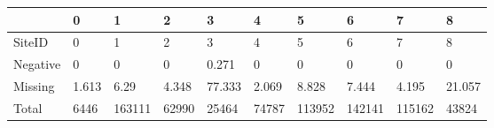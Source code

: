 \begin{tabular}{llllllllll}
\toprule
{} &      0 &       1 &      2 &       3 &      4 &       5 &       6 &       7 &       8 \\
\midrule
SiteID   &      0 &       1 &      2 &       3 &      4 &       5 &       6 &       7 &       8 \\
Negative &      0 &       0 &      0 &   0.271 &      0 &       0 &       0 &       0 &       0 \\
Missing  &  1.613 &    6.29 &  4.348 &  77.333 &  2.069 &   8.828 &   7.444 &   4.195 &  21.057 \\
Total    &   6446 &  163111 &  62990 &   25464 &  74787 &  113952 &  142141 &  115162 &   43824 \\
\bottomrule
\end{tabular}
